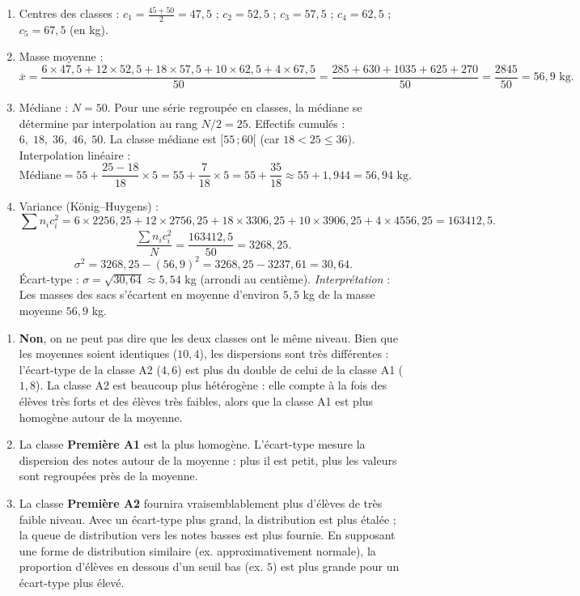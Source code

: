 \documentclass[11pt]{article}
\begin{document}
\begin{corrige}
\begin{enumerate}
\item Centres des classes :
$c_1 = \frac{45+50}{2}=47,5$ ; $c_2=52,5$ ; $c_3=57,5$ ; $c_4=62,5$ ; $c_5=67,5$ (en kg).
\item Masse moyenne :
\[
\overline{x} = \frac{6\times47,5 + 12\times52,5 + 18\times57,5 + 10\times62,5 + 4\times67,5}{50}
= \frac{285 + 630 + 1035 + 625 + 270}{50} = \frac{2845}{50} = 56,9 \text{ kg}.
\]
\item Médiane : $N=50$. Pour une série regroupée en classes, la médiane se détermine par interpolation au rang $N/2 = 25$. Effectifs cumulés : $6,\;18,\;36,\;46,\;50$. La classe médiane est $[55\,;60[$ (car $18 < 25 \le 36$). Interpolation linéaire :
\[
\text{Médiane} = 55 + \frac{25 - 18}{18}\times 5 = 55 + \frac{7}{18}\times5 = 55 + \frac{35}{18} \approx 55 + 1,944 = 56,94 \text{ kg}.
\]
\item Variance (König–Huygens) :
\[
\sum n_i c_i^2 = 6\times2256,25 + 12\times2756,25 + 18\times3306,25 + 10\times3906,25 + 4\times4556,25 = 163412,5.
\]
\[
\frac{\sum n_i c_i^2}{N} = \frac{163412,5}{50} = 3268,25.
\]
\[
\sigma^2 = 3268,25 - (56,9)^2 = 3268,25 - 3237,61 = 30,64.
\]
Écart-type : $\sigma = \sqrt{30,64} \approx 5,54$ kg (arrondi au centième).
\emph{Interprétation} : Les masses des sacs s'écartent en moyenne d'environ $5,5$ kg de la masse moyenne $56,9$ kg.
\end{enumerate}
\end{corrige}

\begin{corrige}
\begin{enumerate}
\item \textbf{Non}, on ne peut pas dire que les deux classes ont le même niveau. Bien que les moyennes soient identiques ($10,4$), les dispersions sont très différentes : l'écart-type de la classe A2 ($4,6$) est plus du double de celui de la classe A1 ($1,8$). La classe A2 est beaucoup plus hétérogène : elle compte à la fois des élèves très forts et des élèves très faibles, alors que la classe A1 est plus homogène autour de la moyenne.
\item La classe \textbf{Première A1} est la plus homogène. L'écart-type mesure la dispersion des notes autour de la moyenne : plus il est petit, plus les valeurs sont regroupées près de la moyenne.
\item La classe \textbf{Première A2} fournira vraisemblablement plus d'élèves de très faible niveau. Avec un écart-type plus grand, la distribution est plus étalée ; la queue de distribution vers les notes basses est plus fournie. En supposant une forme de distribution similaire (ex. approximativement normale), la proportion d'élèves en dessous d'un seuil bas (ex. $5$) est plus grande pour un écart-type plus élevé.
\end{enumerate}
\end{corrige}
\end{document}
